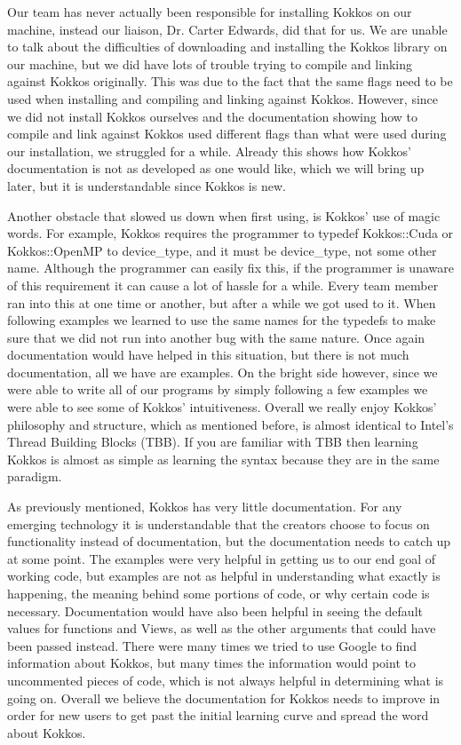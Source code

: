Our team has never actually been responsible for installing Kokkos on our machine, instead our liaison, Dr. Carter Edwards, did that for us. We are unable to talk about the difficulties of downloading and installing the Kokkos library on our machine, but we did have lots of trouble trying to compile and linking against Kokkos originally. This was due to the fact that the same flags need to be used when installing and compiling and linking against Kokkos. However, since we did not install Kokkos ourselves and the documentation showing how to compile and link against Kokkos used different flags than what were used during our installation, we struggled for a while. Already this shows how Kokkos' documentation is not as developed as one would like, which we will bring up later, but it is understandable since Kokkos is new. 

Another obstacle that slowed us down when first using, is Kokkos' use of magic
words. For example, Kokkos requires the programmer to typedef Kokkos::Cuda or
Kokkos::OpenMP to device\_type, and it must be device\_type, not some other
name. Although the programmer can easily fix this, if the programmer is unaware
of this requirement it can cause a lot of hassle for a while. Every team member
ran into this at one time or another, but after a while we got used to it. When
following examples we learned to use the same names for the typedefs to make
sure that we did not run into another bug with the same nature. Once again
documentation would have helped in this situation, but there is not much
documentation, all we have are examples. On the bright side however, since we
were able to write all of our programs by simply following a few examples we
were able to see some of Kokkos' intuitiveness. Overall we really enjoy Kokkos'
philosophy and structure, which as mentioned before, is almost identical to
Intel's Thread Building Blocks (TBB). If you are familiar with TBB then
learning Kokkos is almost as simple as learning the syntax because they are in
the same paradigm. 

As previously mentioned, Kokkos has very little documentation. For any emerging
technology it is understandable that the creators choose to focus on
functionality instead of documentation, but the documentation needs to catch up
at some point. The examples were very helpful in getting us to our end goal of
working code, but examples are not as helpful in understanding what exactly is
happening, the meaning behind some portions of code, or why certain code is
necessary. Documentation would have also been helpful in seeing the default
values for functions and Views, as well as the other arguments that could have
been passed instead. There were many times we tried to use Google to find
information about Kokkos, but many times the information would point to
uncommented pieces of code, which is not always helpful in determining what is
going on. Overall we believe the documentation for Kokkos needs to improve in
order for new users to get past the initial learning curve and spread the word
about Kokkos. 

